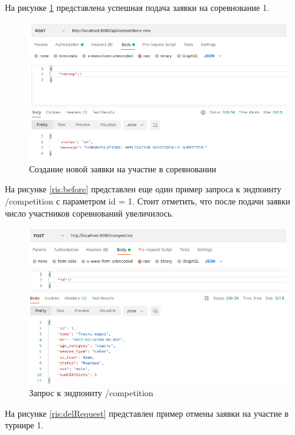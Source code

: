 На рисунке \ref{ris:newRequest} представлена успешная подача заявки на соревнование 1. 

\begin{figure}[H]
	\includegraphics[width=1\columnwidth]{assets/newRequest.png}
	\centering
	\caption{Создание новой заявки на участие в соревновании}
	\label{ris:newRequest}
\end{figure}

На рисунке \ref{ris:before} представлен еще один пример запроса к эндпоинту /competition с параметром id = 1. Стоит отметить, что после подачи заявки число участников соревнований увеличилось.

\begin{figure}[H]
	\includegraphics[width=1\columnwidth]{assets/after.png}
	\centering
	\caption{Запрос к эндпоинту /competition}
	\label{ris:after}
\end{figure}

На рисунке \ref{ris:delRequest} представлен пример отмены заявки на участие в турнире 1.

